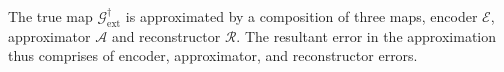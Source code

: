 \documentclass{article}
\begin{document}


The true map $\mathcal{G}^{\dagger}_{\text{ext}}$ is approximated by a composition of three maps, encoder $\mathcal{E}$, approximator $\mathcal{A}$ and reconstructor $\mathcal{R}$. The resultant error in the approximation thus comprises of encoder, approximator, and reconstructor errors.
\end{document}
